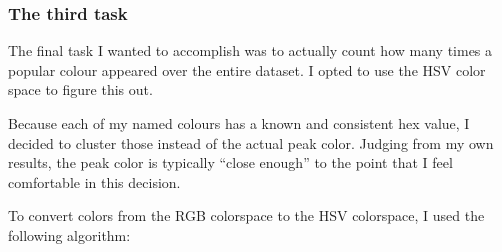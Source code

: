 \documentclass[11pt]{article}
\begin{document}
\hypertarget{the-third-task}{%
\subsubsection{The third task}\label{the-third-task}}

The final task I wanted to accomplish was to actually count how many
times a popular colour appeared over the entire dataset. I opted to use
the HSV color space to figure this out.

Because each of my named colours has a known and consistent hex value, I
decided to cluster those instead of the actual peak color. Judging from
my own results, the peak color is typically ``close enough'' to the
point that I feel comfortable in this decision.

To convert colors from the RGB colorspace to the HSV colorspace, I used
the following algorithm:
\end{document}
